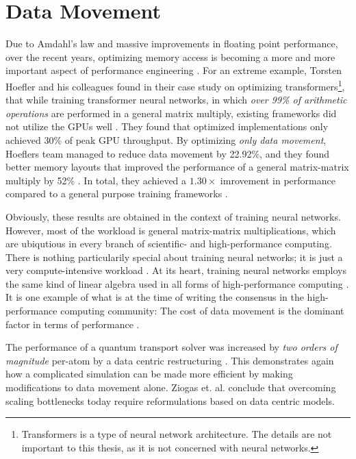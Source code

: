 \section{Data Movement}
\label{sec:dops}
Due to Amdahl's law and massive improvements in floating point performance,
over the recent years, optimizing memory access is becoming a more and more
important aspect of performance engineering
\cite{hoefler2021datamovement, hoefler2017trends}.
For an extreme example, Torsten Hoefler and his colleagues found 
in their case study on optimizing transformers\footnote{
    Transformers is a type of neural network architecture.
    The details are not important to this thesis, as it is not
    concerned with neural networks.
},
that while training transformer neural networks, 
in which {\em over 99\% of arithmetic operations} are performed in a 
general matrix multiply,
existing frameworks did not utilize the GPUs well
\cite{hoefler2021datamovement}.
They found that optimized implementations only achieved
30\% of peak GPU throughput\cite{hoefler2021datamovement}.
By optimizing {\em only data movement},
Hoeflers team managed to reduce data movement by 22.92\%,
and they found better memory layouts that improved the performance
of a general matrix-matrix multiply by 52\% \cite{hoefler2021datamovement}.
In total, they achieved a $1.30\times$ imrovement in performance
compared to a general purpose training frameworks
\cite{hoefler2021datamovement}.

Obviously, these results are obtained in the context of training
neural networks.
However, most of the workload is general matrix-matrix multiplications,
which are ubiqutious in every branch of scientific- and 
high-performance computing.
There is nothing particularily special about training neural
networks; it is just a very compute-intensive workload
\cite{hoefler2021datamovement}.
At its heart, training neural networks employs the same kind of linear
algebra used in all forms of high-performance computing \cite{citation needed}.
It is one example of what is at the time of writing the consensus in the 
high-performance computing community: The cost of data movement is the dominant
factor in terms of performance
\cite{hoefler2017trends}.

The performance of a quantum transport solver was increased by {\em two
orders of magnitude} per-atom by a data centric restructuring
\cite{ziogas2019quantum}.
This demonstrates again how a complicated simulation can be made more efficient
by making modifications to data movement alone.
Ziogas et. al. conclude that overcoming scaling bottlenecks today require
reformulations based on data centric models. 

